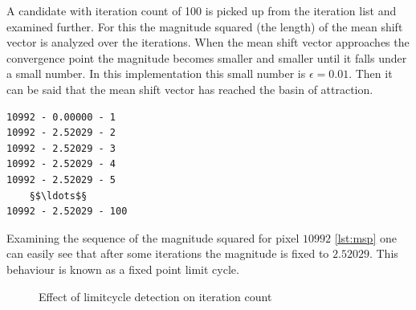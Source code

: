 A candidate with iteration count of 100 is picked up from the iteration list and
examined further. For this the magnitude squared (the length) of the mean shift
vector is analyzed over the iterations. When the mean shift vector approaches
the convergence point the magnitude becomes smaller and smaller until it falls
under a small number. In this implementation this small number is
$\epsilon=0.01$. Then it can be said that the mean shift vector has reached the
basin of attraction.

\begin{lstlisting}[caption=Magnitude squared of pixel 10992, label=lst:msp]
10992 - 0.00000 - 1
10992 - 2.52029 - 2
10992 - 2.52029 - 3
10992 - 2.52029 - 4
10992 - 2.52029 - 5
	§$\ldots$§
10992 - 2.52029 - 100
\end{lstlisting}
Examining the sequence of the magnitude squared for pixel $10992$
\autoref{lst:msp} one can easily see that after some iterations the magnitude is
fixed to $2.52029$. This behaviour is known as a fixed point limit cycle.




\begin{figure}[ht]
\centering
{}%
%
%

\caption{Effect of limitcycle detection on iteration count}
\label{fig:limitcycle}
\end{figure}


